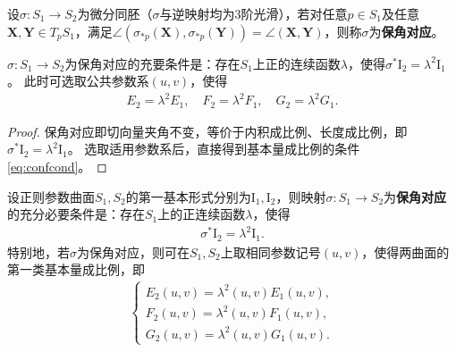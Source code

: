 \documentclass[../../main.tex]{subfiles}%
\begin{document}
\begin{definition}
设$\sigma:S_1\to S_2$为微分同胚（$\sigma$与逆映射均为3阶光滑），若对任意$p\in S_1$及任意$\boldsymbol{X},\boldsymbol{Y}\in T_pS_1$，满足$\angle(\sigma_{*p}(\boldsymbol{X}),\sigma_{*p}(\boldsymbol{Y}))=\angle(\boldsymbol{X},\boldsymbol{Y})$，则称$\sigma$为\textbf{保角对应}。
\end{definition}

\begin{theorem}
$\sigma:S_1\to S_2$为保角对应的充要条件是：存在$S_1$上正的连续函数$\lambda$，使得$\sigma^*\mathrm{I}_2=\lambda^2\mathrm{I}_1$。
此时可选取公共参数系$(u,v)$，使得
\begin{align}
E_2=\lambda^2E_1,\quad F_2=\lambda^2F_1,\quad G_2=\lambda^2G_1.\label{eq:confcond}
\end{align}
\end{theorem}
\begin{proof}
保角对应即切向量夹角不变，等价于内积成比例、长度成比例，即$\sigma^*\mathrm{I}_2=\lambda^2\mathrm{I}_1$。
选取适用参数系后，直接得到基本量成比例的条件\eqref{eq:confcond}。
\end{proof}

\begin{theorem}
设正则参数曲面$S_1,S_2$的第一基本形式分别为$\mathrm{I}_1,\mathrm{I}_2$，则映射$\sigma:S_1\to S_2$为\textbf{保角对应}的充分必要条件是：存在$S_1$上的正连续函数$\lambda$，使得
\begin{align}
\sigma^*\mathrm{I}_2 = \lambda^2\mathrm{I}_1.
\label{eq:conformalcond}
\end{align}
特别地，若$\sigma$为保角对应，则可在$S_1,S_2$上取相同参数记号$(u,v)$，使得两曲面的第一类基本量成比例，即
\begin{align}
\begin{cases}
E_2(u,v)=\lambda^2(u,v)E_1(u,v),\\
F_2(u,v)=\lambda^2(u,v)F_1(u,v),\\
G_2(u,v)=\lambda^2(u,v)G_1(u,v).
\end{cases}
\label{eq:basicalpropconformal}
\end{align}
\end{theorem}
\end{document}
